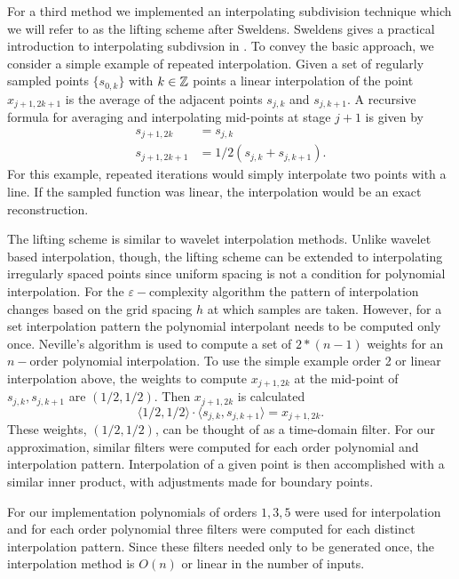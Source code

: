For a third method we implemented an interpolating 
subdivision technique which we will refer to 
as the lifting scheme after Sweldens. Sweldens gives
a practical introduction to interpolating subdivsion 
in \cite{sweldens1996}. To 
convey the basic approach, we consider a simple 
example of repeated interpolation. Given a set 
of regularly sampled points $\{ s_{0,k} \}$ with 
$k \in \mathbb{Z}$ points a linear interpolation of the 
point $x_{j+1, 2k + 1}$ is the average of the 
adjacent points $s_{j,k}$ and $s_{j,k+1}$. A
recursive formula for averaging and interpolating 
mid-points at stage $j+1$ is given by
\begin{align*}
      s_{j+1, 2k} &= s_{j,k} \\
      s_{j + 1, 2k+1} &= 1/2(s_{j,k} + s_{j,k+1}).
 \end{align*}
 For this example, repeated iterations would simply interpolate two points with a line. If the sampled function was linear, the interpolation would be an exact reconstruction. 

The lifting scheme is similar to wavelet interpolation methods. Unlike wavelet based interpolation, though, the lifting scheme can be extended to interpolating
irregularly spaced points since uniform spacing is not a condition for polynomial interpolation. For the $\varepsilon-$complexity algorithm the pattern of interpolation changes based on the grid spacing $h$ at which samples are taken. 
However, for a set interpolation pattern the  
polynomial interpolant needs to be computed 
only once. Neville's algorithm is used 
to compute a set of $2*(n-1)$ weights for an 
$n-$order polynomial interpolation. To use the 
simple example order 2 or linear interpolation above, 
the weights to compute $x_{j+1, 2k}$ at the 
mid-point of $s_{j, k}, s_{j, k+1}$ are 
$(1/2, 1/2)$. Then $x_{j+1, 2k}$ is calculated
\[
   \langle 1/2 , 1/2 \rangle \cdot 
   \langle s_{j, k}, s_{j, k+1} \rangle = x_{j+1, 2k}.  
\]
These weights, $(1/2, 1/2)$, can be thought of 
as a time-domain filter. For our approximation, similar 
filters were computed for each order polynomial and interpolation
pattern. Interpolation of a given point is then accomplished with 
a similar inner product, with adjustments made for boundary points.

For our implementation 
polynomials of orders ${1,3,5}$ were used for interpolation and for each order polynomial three filters were computed for each distinct
interpolation pattern. Since these filters needed only to be generated once, the interpolation
method is $O(n)$ or linear in the number of inputs. 

